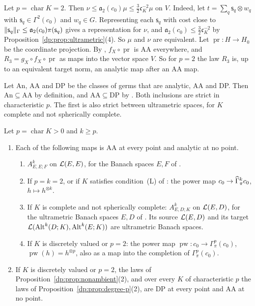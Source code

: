 \begin{remark}\label{dp:rem:nu-mu}
Let $p=\operatorname{char}K=2$. Then $\nu\le\mathfrak a_2(c_0)\mu\le\frac32\mathfrak c_K^{-2}\mu$ on $V$. Indeed, let $t=\sum_q\mathsf s_q\otimes w_q$ with $\mathsf s_q\in\Gamma^2(c_0)$ and $w_q\in G$. Representing each $\mathsf s_q$ with cost close to $\lVert \mathsf s_q\rVert_\Gamma\le\mathfrak a_2(c_0)\pi(\mathsf s_q)$ gives a representation for $\nu$, and $\mathfrak a_2(c_0)\le\frac32\mathfrak c_K^{-2}$ by Proposition~\ref{dp:prop:ultrametric}(4). So $\mu$ and $\nu$ are equivalent. Let $\operatorname{pr}\colon H\to H_0$ be the coordinate projection. By \cite[Proposition~14.12(1)(b)]{I}, $f_X\circ\operatorname{pr}$ is AA everywhere, and $R_3=g_X\circ f_X\circ\operatorname{pr}$ as maps into the vector space $V$. So for $p=2$ the law $R_3$ is, up to an equivalent target norm, an analytic map after an AA map.
\end{remark}

Let $\mathrm{An}$, $\mathrm{AA}$ and $\mathrm{DP}$ be the classes of germs that are analytic, AA and DP. Then $\mathrm{An}\subseteq\mathrm{AA}$ by definition, and $\mathrm{AA}\subseteq\mathrm{DP}$ by \cite[Proposition~14.9(1)]{I}. Both inclusions are strict in characteristic $p$. The first is also strict between ultrametric spaces, for $K$ complete and not spherically complete.

\begin{proposition}\label{dp:prop:strict}
Let $p=\operatorname{char}K>0$ and $k\ge p$.
\begin{enumerate}
\item Each of the following maps is AA at every point and analytic at no point.
\begin{enumerate}
\item $A^k_{E,E;F}$ on $\mathcal L(E,E)$, for the Banach spaces $E,F$ of \cite[Theorem~7.2(1)]{I}.
\item If $p=k=2$, or if $K$ satisfies condition~\textup{(L)} of \cite[Section~7.1]{I}: the power map $c_0\to\widehat\Gamma^k_\pi c_0$, $h\mapsto h^{\otimes k}$.
\item If $K$ is complete and not spherically complete: $A^k_{E,D;K}$ on $\mathcal L(E,D)$, for the ultrametric Banach spaces $E,D$ of \cite[Theorem~7.2(2)]{I}. Its source $\mathcal L(E,D)$ and its target $\mathcal L(\operatorname{Alt}^k(D;K),\operatorname{Alt}^k(E;K))$ are ultrametric Banach spaces.
\item If $K$ is discretely valued or $p=2$: the power map $\operatorname{pw}\colon c_0\to\Gamma^p_\pi(c_0)$, $\operatorname{pw}(h)=h^{\otimes p}$, also as a map into the completion of $\Gamma^p_\pi(c_0)$.
\end{enumerate}
\item If $K$ is discretely valued or $p=2$, the laws of Proposition~\ref{dp:prop:nonambient}(2), and over every $K$ of characteristic $p$ the laws of Proposition~\ref{dp:prop:degree-p}(2), are DP at every point and AA at no point.
\end{enumerate}
\end{proposition}

